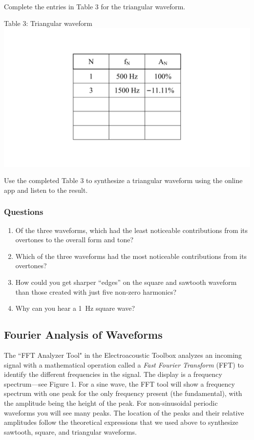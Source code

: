 \documentclass[11pt]{NSF}
\def\ben{\begin{enumerate}}
\def\een{\end{enumerate}}
\def\i{\item{}}
\begin{document}
Complete the entries in Table 3 for the triangular waveform.
%
\begin{table}[hbtp]
\begin{center}
Table 3: Triangular waveform\\
\includegraphics[width=.35\textwidth]{tab5_3}
\label{t:3}
\end{center}
\end{table}
%

Use the completed Table 3 to synthesize a triangular 
waveform using the online app and listen to the result.

\subsubsection*{Questions}
\ben
\i Of the three waveforms, which had the least noticeable 
contributions from its overtones to the overall form and tone?

\i Which of the three waveforms had the most 
noticeable contributions from its overtones?

\i How could you get sharper ``edges” on the square and 
sawtooth waveform than those created with just five non-zero
harmonics?

\i Why can you hear a 1~Hz square wave?
\een

\subsection{Fourier Analysis of Waveforms}

The ``FFT Analyzer Tool" in the Electroacoustic Toolbox 
analyzes an incoming signal with a mathematical operation 
called a {\em Fast Fourier Transform} (FFT) to 
identify the different frequencies in the signal. 
The display is a frequency spectrum---see Figure 1.
For a sine wave, the FFT tool will show a frequency spectrum with one peak for
the only frequency present (the fundamental), 
with the amplitude being the height of the peak.
For non-sinusoidal periodic waveforms you will see many peaks.
The location of the peaks and their relative amplitudes 
follow the theoretical expressions that we used above to synthesize
sawtooth, square, and triangular waveforms.
\end{document}

